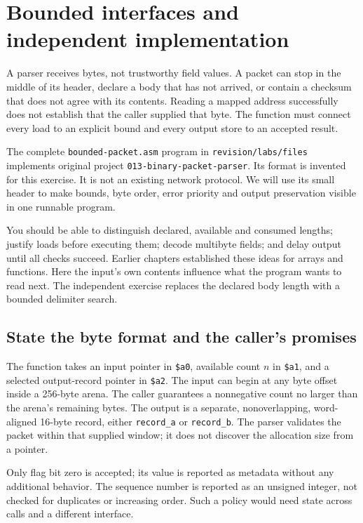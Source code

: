 \chapter{Bounded interfaces and independent implementation}
\label{revision:bounded-interfaces}

A parser receives bytes, not trustworthy field values. A packet can stop in the
middle of its header, declare a body that has not arrived, or contain a checksum
that does not agree with its contents. Reading a mapped address successfully does
not establish that the caller supplied that byte. The function must connect every
load to an explicit bound and every output store to an accepted result.

The complete \texttt{bounded-packet.asm} program in \texttt{revision/labs/files}
implements original project \texttt{013-binary-packet-parser}. Its format is
invented for this exercise. It is not an existing network protocol. We will use
its small header to make bounds, byte order, error priority and output preservation
visible in one runnable program.

You should be able to distinguish declared, available and consumed lengths;
justify loads before executing them; decode multibyte fields; and delay output
until all checks succeed. Earlier chapters established these ideas for arrays
and functions. Here the input's own contents influence what the program wants
to read next. The independent exercise replaces the declared body length with
a bounded delimiter search.

\section{State the byte format and the caller's promises}

The function takes an input pointer in \texttt{\$a0}, available count $n$ in
\texttt{\$a1}, and a selected output-record pointer in \texttt{\$a2}. The input
can begin at any byte offset inside a 256-byte arena. The caller guarantees a
nonnegative count no larger than the arena's remaining bytes. The output is a
separate, nonoverlapping, word-aligned 16-byte record, either \texttt{record\_a}
or \texttt{record\_b}. The parser validates the packet within that supplied window;
it does not discover the allocation size from a pointer.



\begin{samepage}
  Only flag bit zero is accepted; its value is reported as metadata without any
  additional behavior. The sequence number is reported as an unsigned integer,
  not checked for duplicates or increasing order. Such a policy would need state
  across calls and a different interface.\par
\end{samepage}

